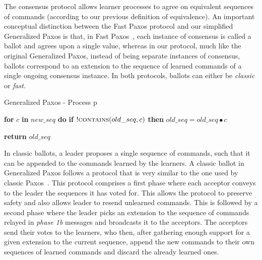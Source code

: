 The consensus protocol allows learner processes to agree on equivalent sequences of commands (according to our previous definition of equivalence).
An important conceptual distinction between the Fast Paxos protocol and our simplified Generalized Paxos is that, in Fast Paxos~\cite{L06}, each instance of consensus is called a ballot and agrees upon a single value, whereas in our protocol, much like the original Generalized Paxos, instead of being separate instances of consensus, ballots correspond to an extension to the sequence of learned commands of a single ongoing consensus instance. In both protocols, ballots can either be \textit{classic} or \textit{fast}. \par
\begin{algorithm}
	\caption{Generalized Paxos - Process p}
	\begin{algorithmic}[1]
		
		\State \textbf{for} $c$ \textbf{in} $new\_seq$ \textbf{do} 
		\State \hspace{\algorithmicindent} \textbf{if} $!\Call{contains}{old\_seq,c}$ \textbf{then}
		\State \hspace{\algorithmicindent}\hspace{\algorithmicindent}\hspace{\algorithmicindent} $old\_seq =  old\_seq \bullet c$

		\State \textbf{return} $old\_seq$
		\EndFunction
	\end{algorithmic}
\end{algorithm}
In classic ballots, a leader proposes a single sequence of commands, such that it can be appended to the commands learned by the learners. 
A classic ballot in Generalized Paxos follows a protocol that is very similar to the one used by classic Paxos~\cite{Lamport:1998}. This protocol comprises a first phase where each acceptor conveys to the leader the sequences it has voted for. This allows the protocol to preserve safety and also allows leader to resend unlearned commands. This is followed by a second phase where the leader picks an extension to the sequence of commands relayed in \textit{phase 1b} messages and broadcasts it to the acceptors. The acceptors send their votes to the learners, who then, after gathering enough support for a given extension to the current sequence, append the new commands to their own sequences of learned commands and discard the already learned ones.\par

